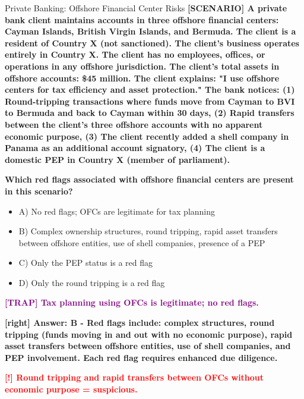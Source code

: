 \documentclass[11pt,a4paper]{beamer}
\newcommand{\redflag}[1]{\textcolor{red}{\textbf{[!] #1}}}
\newcommand{\trap}[1]{\textcolor{purple}{\textbf{[TRAP] #1}}}
\newcommand{\correct}[1]{\textcolor{green!50!black}{\textbf{[right] #1}}}
\newcommand{\scenario}[1]{\textcolor{blue!70!black}{\textbf{[SCENARIO] #1}}}
\begin{document}
	
	\begin{frame}{Private Banking: Offshore Financial Center Risks}
		\tiny
		\scenario{A private bank client maintains accounts in three offshore financial centers: Cayman Islands, British Virgin Islands, and Bermuda. The client is a resident of Country X (not sanctioned). The client's business operates entirely in Country X. The client has no employees, offices, or operations in any offshore jurisdiction. The client's total assets in offshore accounts: \$45 million. The client explains: "I use offshore centers for tax efficiency and asset protection." The bank notices: (1) Round-tripping transactions where funds move from Cayman to BVI to Bermuda and back to Cayman within 30 days, (2) Rapid transfers between the client's three offshore accounts with no apparent economic purpose, (3) The client recently added a shell company in Panama as an additional account signatory, (4) The client is a domestic PEP in Country X (member of parliament).}
		
		\vspace{0.02cm}
		\textbf{Which red flags associated with offshore financial centers are present in this scenario?}
		\vspace{0.02cm}
		
		\begin{itemize}
			\item A) No red flags; OFCs are legitimate for tax planning
			\item B) Complex ownership structures, round tripping, rapid asset transfers between offshore entities, use of shell companies, presence of a PEP
			\item C) Only the PEP status is a red flag
			\item D) Only the round tripping is a red flag
		\end{itemize}
		
		\vspace{0.02cm}
		\trap{Tax planning using OFCs is legitimate; no red flags.}
		
		\vspace{0.02cm}
		\correct{Answer: B - Red flags include: complex structures, round tripping (funds moving in and out with no economic purpose), rapid asset transfers between offshore entities, use of shell companies, and PEP involvement. Each red flag requires enhanced due diligence.}
		
		\vspace{0.02cm}
		\redflag{Round tripping and rapid transfers between OFCs without economic purpose = suspicious.}
	\end{frame}
	
\end{document}
